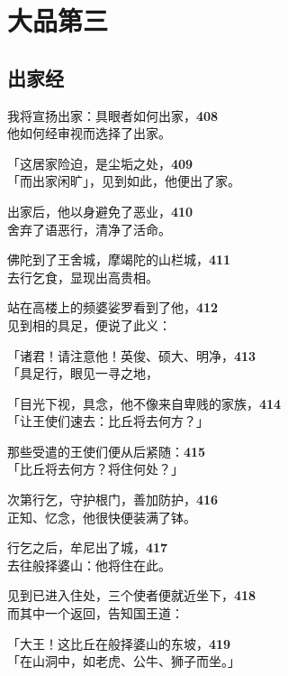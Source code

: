 \chapter{大品第三}

\section{出家经}

我将宣扬出家：具眼者如何出家，\hfill{\grayfootnotesize \textbf{408}} \\
他如何经审视而选择了出家。


「这居家险迫，是尘垢之处，\hfill{\grayfootnotesize \textbf{409}} \\
「而出家闲旷」，见到如此，他便出了家。


出家后，他以身避免了恶业，\hfill{\grayfootnotesize \textbf{410}} \\
舍弃了语恶行，清净了活命。


佛陀到了王舍城，摩竭陀的山栏城，\hfill{\grayfootnotesize \textbf{411}} \\
去行乞食，显现出高贵相。


站在高楼上的频婆娑罗看到了他，\hfill{\grayfootnotesize \textbf{412}} \\
见到相的具足，便说了此义：


「诸君！请注意他！英俊、硕大、明净，\hfill{\grayfootnotesize \textbf{413}} \\
「具足行，眼见一寻之地，


「目光下视，具念，他不像来自卑贱的家族，\hfill{\grayfootnotesize \textbf{414}} \\
「让王使们速去：比丘将去何方？」


那些受遣的王使们便从后紧随：\hfill{\grayfootnotesize \textbf{415}} \\
「比丘将去何方？将住何处？」

次第行乞，守护根门，善加防护，\hfill{\grayfootnotesize \textbf{416}} \\
正知、忆念，他很快便装满了钵。


行乞之后，牟尼出了城，\hfill{\grayfootnotesize \textbf{417}} \\
去往般择婆山：他将住在此。


见到已进入住处，三个使者便就近坐下，\hfill{\grayfootnotesize \textbf{418}} \\
而其中一个返回，告知国王道：

「大王！这比丘在般择婆山的东坡，\hfill{\grayfootnotesize \textbf{419}} \\
「在山洞中，如老虎、公牛、狮子而坐。」


